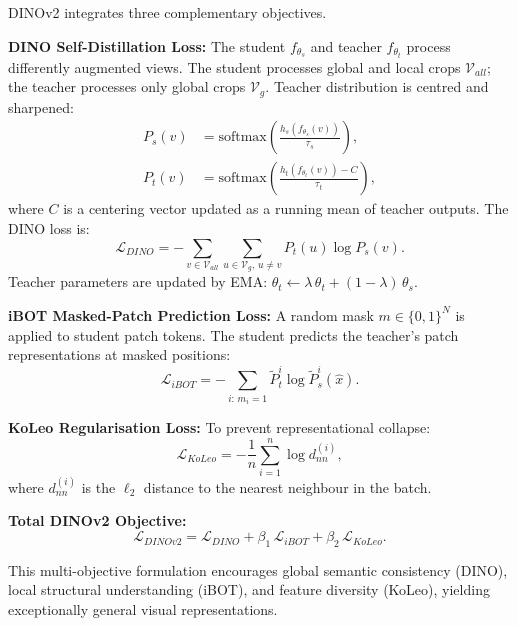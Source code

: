 \documentclass[journal]{IEEEtran}
\begin{document}
DINOv2 integrates three complementary objectives.

\textbf{DINO Self-Distillation Loss:} The student $f_{\theta_s}$ and teacher $f_{\theta_t}$
process differently augmented views. The student processes global and local crops
$\mathcal{V}_{all}$; the teacher processes only global crops $\mathcal{V}_g$. Teacher
distribution is centred and sharpened:
\begin{align}
    P_s(v) &= \text{softmax}\!\left(\tfrac{h_s(f_{\theta_s}(v))}{\tau_s}\right), \\[4pt]
    P_t(v) &= \text{softmax}\!\left(\tfrac{h_t(f_{\theta_t}(v)) - C}{\tau_t}\right),
\end{align}
where $C$ is a centering vector updated as a running mean of teacher outputs. The DINO loss is:
\begin{equation}
    \mathcal{L}_{DINO} = -\sum_{v \in \mathcal{V}_{all}} \sum_{u \in \mathcal{V}_g,\, u \neq v}
    P_t(u) \log P_s(v).
    \label{eq:dino_loss}
\end{equation}
Teacher parameters are updated by EMA: $\theta_t \leftarrow \lambda\,\theta_t + (1 - \lambda)\,\theta_s$.

\textbf{iBOT Masked-Patch Prediction Loss:} A random mask $m \in \{0,1\}^N$ is applied to
student patch tokens. The student predicts the teacher's patch representations at masked positions:
\begin{equation}
    \mathcal{L}_{iBOT} = -\sum_{i:\, m_i=1}
    \tilde{P}_t^i \log \tilde{P}_s^i(\hat{x}).
    \label{eq:ibot_loss}
\end{equation}

\textbf{KoLeo Regularisation Loss:} To prevent representational collapse:
\begin{equation}
    \mathcal{L}_{KoLeo} = -\frac{1}{n}\sum_{i=1}^{n} \log d_{nn}^{(i)},
    \label{eq:koleo}
\end{equation}
where $d_{nn}^{(i)}$ is the $\ell_2$ distance to the nearest neighbour in the batch.

\textbf{Total DINOv2 Objective:}
\begin{equation}
    \mathcal{L}_{DINOv2} = \mathcal{L}_{DINO} + \beta_1\,\mathcal{L}_{iBOT}
    + \beta_2\,\mathcal{L}_{KoLeo}.
    \label{eq:dinov2_loss}
\end{equation}

This multi-objective formulation encourages global semantic consistency (DINO), local structural
understanding (iBOT), and feature diversity (KoLeo), yielding exceptionally general visual
representations.
\end{document}
